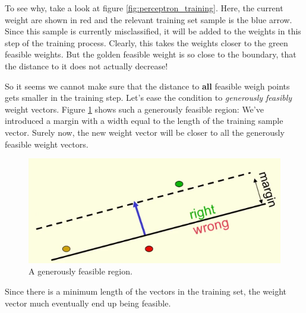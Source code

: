 \documentclass[12pt, a4paper]{article}
\numberwithin{equation}{section}
\begin{document}
To see why, take a look at figure \ref{fig:perceptron_training}. Here, the current weight are shown in red and the relevant training set sample is the blue arrow. Since this sample is currently misclassified, it will be added to the weights in this step of the training process. Clearly, this takes the weights closer to the green feasible weights. But the golden feasible weight is so close to the boundary, that the distance to it does not actually decrease!

So it seems we cannot make sure that the distance to \textbf{all} feasible weigh points gets smaller in the training step. Let's ease the condition to \textit{generously feasibly} weight vectors. Figure \ref{fig:generously_feasible} shows such a generously feasible region: We've introduced a margin with a width equal to the length of the training sample vector. Surely now, the new weight vector will be closer to all the generously feasible weight vectors.

\begin{figure}
\centering
\includegraphics[width=\textwidth]{generously_feasible}
\caption{A generously feasible region.}
\label{fig:generously_feasible}
\end{figure}

Since there is a minimum length of the vectors in the training set, the weight vector much eventually end up being feasible.
\end{document}
